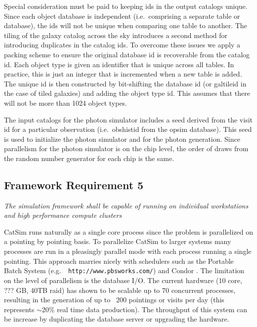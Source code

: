 \documentclass[]{article}
\begin{document}
{Special consideration must be paid to keeping ids in the output
catalogs unique.  Since each object database is independent (i.e.\
comprising a separate table or database), the ids will not be unique
when comparing one table to another. The tiling of the galaxy catalog
across the sky introduces a second method for introducing duplicates
in the catalog ids. To overcome these issues we apply a packing scheme
to ensure the original database id is recoverable from the catalog id.
Each object type is given an identifier that is unique across all
tables.  In practice, this is just an integer that is incremented when
a new table is added.  The unique id is then constructed by
bit-shifting the database id (or galtileid in the case of tiled
galaxies) and adding the object type id.  This assumes that there  will
not be more than 1024 object types.  

The input catalogs for the photon simulator includes a seed derived
from the visit id for a particular observation (i.e.\ obshistid from
the opsim database). This seed is used to initialize the photon
simulator and for the photon generation. Since parallelism for the
photon simulator is on the chip level, the order of draws from the
random number generator for each chip is the same.


\subsection{Framework Requirement 5}

{\it The simulation framework shall be capable of running on individual workstations 
and high performance compute clusters}


CatSim runs naturally as a single core process since the problem is
parallelized on a pointing by pointing basis.  To parallelize CatSim
to larger systems many processes are run in a pleasingly parallel mode
with each process running a single pointing.  This approach marries
nicely with schedulers such as the Portable Batch System (e.g.\ {\tt
  http://www.pbsworks.com/}) and Condor \citep{condor}.  The
limitation on the level of parallelism is the database I/O.  The
current hardware (10 core, ??? GB, 40TB raid) has shown to be scalable
up to 70 concurrent processes, resulting in the generation of up to
~200 pointings or visits per day (this represents $\sim$20\% real time
data production).  The throughput of this system can be increase by
duplicating the database server or 
upgrading the hardware.

}
\end{document}
